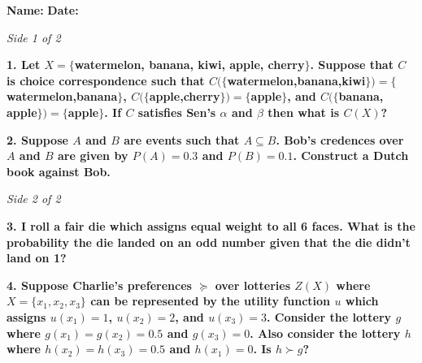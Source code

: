 \documentclass[12pt]{article}
\begin{document}
\noindent
\textbf{Name:}\underline{\hspace{6cm}} \hfill \textbf{Date:}\underline{\hspace{3cm}}

\vspace{0.5em}
\noindent\textit{Side 1 of 2}

\vspace{1.5em}
\noindent\textbf{1. Let $X=\{$watermelon, banana, kiwi, apple, cherry$\}$. Suppose that $C$ is choice correspondence such that $C(\{$watermelon,banana,kiwi$\})=\{$watermelon,banana$\}$, $C(\{$apple,cherry$\})=\{$apple$\}$, and $C(\{$banana, apple$\})=\{$apple$\}$. If $C$ satisfies Sen's $\alpha$ and $\beta$ then what is $C(X)$?}

\vfill

\noindent\textbf{2. Suppose $A$ and $B$ are events such that $A \subseteq B$. Bob's credences over $A$ and $B$ are given by $P(A)=0.3$ and $P(B)=0.1$. Construct a Dutch book against Bob.}

\vfill

\newpage

\noindent\textit{Side 2 of 2}

\vspace{1.5em}
\noindent\textbf{3.  I roll a fair die which assigns equal weight to all 6 faces. What is the probability the die landed on an odd number given that the die didn't land on 1?}

\vfill

\noindent\textbf{4. Suppose Charlie's preferences $\succeq$ over lotteries $Z(X)$ where $X=\{x_1,x_2,x_3\}$ can be represented by the utility function $u$ which assigns $u(x_1)=1$, $u(x_2)=2$, and $u(x_3)=3$. Consider the lottery $g$ where $g(x_1)=g(x_2)=0.5$ and $g(x_3)=0$. Also consider the lottery $h$ where $h(x_2)=h(x_3)=0.5$ and $h(x_1)=0$. Is $h \succ g$?}

\vfill
\end{document}
